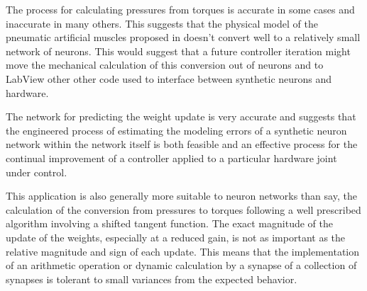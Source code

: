 
The process for calculating pressures from torques is accurate in some
cases and inaccurate in many others. This suggests that the physical
model of the pneumatic artificial muscles proposed in \cite{HuntPMuscles}
doesn't convert well to a relatively small network of neurons. This would
suggest that a future controller iteration might move the mechanical
calculation of this conversion out of neurons and
to LabView other other code used to interface between synthetic neurons and
hardware.


The network for predicting the weight update is very accurate and suggests that
the engineered process of estimating the modeling errors of a synthetic neuron
network within the network itself is both feasible and an effective process for
the continual improvement of a controller applied to a particular hardware
joint under control.

This application is also generally more suitable to neuron networks than say,
the calculation of the conversion from pressures to torques following a well
prescribed algorithm involving a shifted tangent function. The exact magnitude
of the update of the weights, especially at a reduced gain, is not as important
as the relative magnitude and sign of each update. This means that the
implementation of an arithmetic operation or dynamic calculation by a synapse of
a collection of synapses is tolerant to small variances from the expected
behavior.
